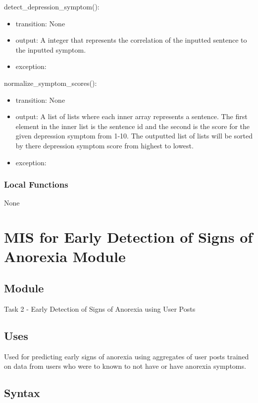 \documentclass[12pt, titlepage]{article}
\begin{document}
\noindent detect\_depression\_symptom():
\begin{itemize}
\item transition: None
\item output: A integer that represents the correlation of the inputted sentence to the inputted symptom.
\item exception: 
\end{itemize}

\noindent normalize\_symptom\_scores():
\begin{itemize}
\item transition: None
\item output: A list of lists where each inner array represents a sentence. The first element in the inner list is the sentence id and the second is the score for the given depression symptom from 1-10. The outputted list of lists will be sorted by there depression symptom score from highest to lowest.
\item exception: 
\end{itemize}


\subsubsection{Local Functions}

None

\newpage

\section{MIS for Early Detection of Signs of Anorexia Module} \label{Module} 

\subsection{Module}

Task 2 - Early Detection of Signs of Anorexia using User Posts

\subsection{Uses}

Used for predicting early signs of anorexia using aggregates of user posts trained on data from users who were to known to not have or have anorexia symptoms.

\subsection{Syntax}
\end{document}
